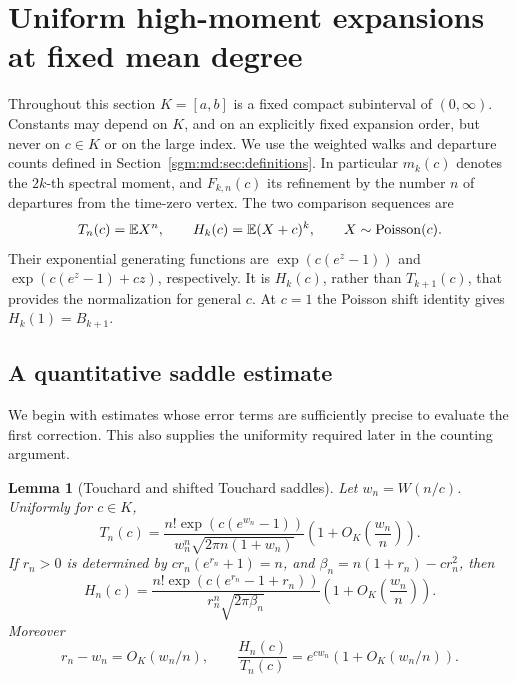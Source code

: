 \documentclass[11pt,letterpaper]{article}
\newtheorem{lemma}[theorem]{Lemma}\newtheorem{proposition}[theorem]{Proposition}\newtheorem{corollary}[theorem]{Corollary}
\theoremstyle{remark}\newtheorem{remark}[theorem]{Remark}
\newcommand{\Poi}{\operatorname{Poisson}}\newcommand{\Bin}{\operatorname{Bin}}
\theoremstyle{definition}\newtheorem{definition}[theorem]{Definition}
\begin{document}
\section{Uniform high-moment expansions at fixed mean degree}
\label{sgm:md:sec:compact-moments}

Throughout this section \(K=[a,b]\) is a fixed compact subinterval of
\((0,\infty)\). Constants may depend on \(K\), and on an explicitly fixed
expansion order, but never on \(c\in K\) or on the large index.
We use the weighted walks and departure counts defined in
Section~\ref{sgm:md:sec:definitions}. In particular \(m_k(c)\) denotes the
\(2k\)-th spectral moment, and \(F_{k,n}(c)\) its refinement by the
number \(n\) of departures from the time-zero vertex. The two comparison
sequences are
\[
 T_n(c)=\E X^n,\qquad H_k(c)=\E(X+c)^k,\qquad X\sim\Poi(c).
\]
Their exponential generating functions are
\(\exp(c(e^z-1))\) and \(\exp(c(e^z-1)+cz)\), respectively.
It is \(H_k(c)\), rather than \(T_{k+1}(c)\), that provides the
normalization for general \(c\). At \(c=1\) the Poisson shift identity
gives \(H_k(1)=B_{k+1}\).

\subsection{A quantitative saddle estimate}

We begin with estimates whose error terms are sufficiently precise to
evaluate the first correction. This also supplies the uniformity required
later in the counting argument.

\begin{lemma}[Touchard and shifted Touchard saddles]\label{sgm:md:cm:saddle}
Let \(w_n=W(n/c)\). Uniformly for \(c\in K\),
\begin{equation}\label{sgm:md:cm:touchard-saddle}
 T_n(c)=
 \frac{n!\exp(c(e^{w_n}-1))}
      {w_n^n\sqrt{2\pi n(1+w_n)}}
 \left(1+O_K\left(\frac{w_n}{n}\right)\right).
\end{equation}
If \(r_n>0\) is determined by \(cr_n(e^{r_n}+1)=n\), and
\(\beta_n=n(1+r_n)-cr_n^2\), then
\begin{equation}\label{sgm:md:cm:shifted-saddle}
 H_n(c)=
 \frac{n!\exp(c(e^{r_n}-1+r_n))}
      {r_n^n\sqrt{2\pi\beta_n}}
 \left(1+O_K\left(\frac{w_n}{n}\right)\right).
\end{equation}
Moreover
\begin{equation}\label{sgm:md:cm:shift-compare}
 r_n-w_n=O_K(w_n/n),\qquad
 \frac{H_n(c)}{T_n(c)}
 =e^{cw_n}\left(1+O_K(w_n/n)\right).
\end{equation}
\end{lemma}
\end{document}
